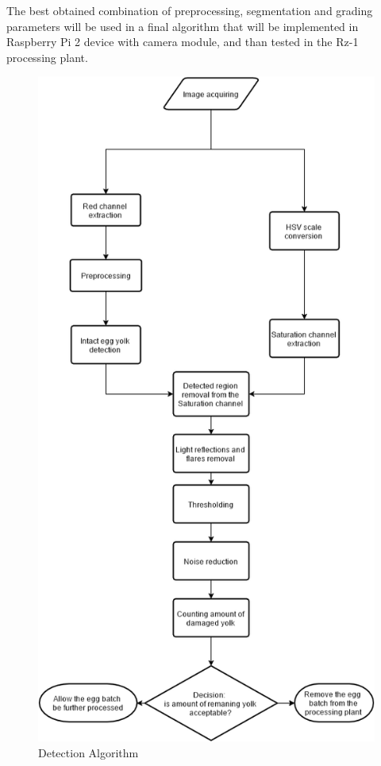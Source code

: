 \documentclass[12pt,twoside,a4paper]{article}
\begin{document}
The best obtained combination of preprocessing, segmentation and grading parameters will be used in a final algorithm that will be implemented in Raspberry Pi 2 device with camera module, and than tested in the Rz-1 processing plant.


\begin{figure}[H]
\centering
\includegraphics[width=0.5\paperwidth]{algorithmV}
\caption{Detection Algorithm}\label{fig:algorithmV}
\end{figure}
\end{document}
